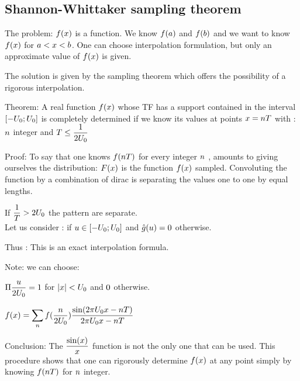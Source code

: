 \documentclass[11pt, openright]{book}
\begin{document}
{   \subsection{Shannon-Whittaker sampling theorem}

   The problem: $\displaystyle{f(x)}$ is a function. We know $\displaystyle{f(a)}$ and $\displaystyle{f(b)}$ and we want to know $\displaystyle{f(x)}$ for $\displaystyle{a<x<b}$. One can choose interpolation formulation, but only an approximate value of $\displaystyle{f(x)}$ is given. %

   The solution is given by the sampling theorem which offers the possibility of a rigorous interpolation. 

   Theorem: A real function $\displaystyle{f(x)}$ whose TF has a support contained in the interval $\displaystyle{[-U_0;U_0]}$ is completely determined if we know its values at points $\displaystyle{x=nT}$ with : $\displaystyle{n}$ integer and $\displaystyle{T\le \frac{1}{2U_0}}$ 
   
   Proof: To say that one knows $\displaystyle{f(nT)}$ for every integer $\displaystyle{n}$ , amounts to giving ourselves the distribution: 
   $\displaystyle{F(x)}$ is the function $\displaystyle{f(x)}$ sampled. 
   Convoluting the function by a combination of dirac is separating the values one to one by equal lengths.
   
   If $\displaystyle{\frac{1}{T}>2U_0}$ the pattern are separate. \\
   Let us consider : 
    if $\displaystyle{u\in [-U_0;U_0]}$ and $\displaystyle{\hat{g}(u)=0}$ otherwise. 
   
   Thus : 
   This is an exact interpolation formula.

   Note: we can choose: 

   $\displaystyle{\Pi \frac{u}{2U_0}=1}$ for $\displaystyle{|x|<U_0}$ and $\displaystyle{0}$ otherwise.
   
   $\displaystyle{f(x)=\sum_{n}^{} f(\frac{n}{2U_0})\frac{\sin(2\pi U_0x-nT)}{2\pi U_0x-nT}}$
   
   Conclusion: The $\displaystyle{\frac{\sin(x)}{x}}$ function is not the only one that can be used. This procedure shows that one can rigorously determine $\displaystyle{f(x)}$ at any point simply by knowing $\displaystyle{f(nT)}$ for $\displaystyle{n}$ integer.
   
}
\end{document}
